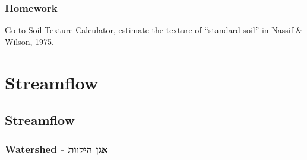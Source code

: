 \documentclass[
  letterpaper,
  DIV=11,
  numbers=noendperiod]{scrreprt}
\begin{document}
\hypertarget{homework-3}{%
\section{Homework}\label{homework-3}}

Go to
\href{https://www.nrcs.usda.gov/wps/portal/nrcs/detail/soils/survey/?cid=nrcs142p2_054167}{Soil
Texture Calculator}, estimate the texture of ``standard soil'' in Nassif
\& Wilson, 1975.

\part{Streamflow}

\hypertarget{streamflow-2}{%
\chapter{Streamflow}\label{streamflow-2}}

\hypertarget{watershed---ux5d0ux5d2ux5df-ux5d4ux5d9ux5e7ux5d5ux5d5ux5ea}{%
\section{Watershed - אגן
היקוות}\label{watershed---ux5d0ux5d2ux5df-ux5d4ux5d9ux5e7ux5d5ux5d5ux5ea}}
\end{document}
